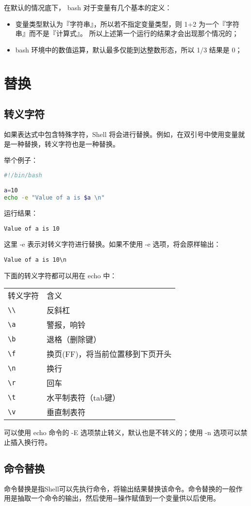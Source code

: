 在默认的情况底下， bash 对于变量有几个基本的定义：
\begin{itemize}
\item 变量类型默认为『字符串』，所以若不指定变量类型，则 1+2 为一个『字符串』而不是『计算式』。 所以上述第一个运行的结果才会出现那个情况的；
\item bash 环境中的数值运算，默认最多仅能到达整数形态，所以 1/3 结果是 0；
\end{itemize}



\section{替换}
\subsection{转义字符}
如果表达式中包含特殊字符，Shell 将会进行替换。例如，在双引号中使用变量就是一种替换，转义字符也是一种替换。

举个例子：
\begin{lstlisting}[language=sh]
#!/bin/bash

a=10
echo -e "Value of a is $a \n"
\end{lstlisting}
运行结果：

\verb|Value of a is 10|

这里 -e 表示对转义字符进行替换。如果不使用 -e 选项，将会原样输出：

\verb|Value of a is 10\n|

下面的转义字符都可以用在 echo 中：
\begin{center}
\begin{tabular}{l|l}
转义字符&	含义\\
\verb|\\|	&反斜杠\\
\verb|\a|	&警报，响铃\\
\verb|\b|	&退格（删除键）\\
\verb|\f|	&换页(FF)，将当前位置移到下页开头\\
\verb|\n|	&换行\\
\verb|\r|	&回车\\
\verb|\t|	&水平制表符（tab键） \\
\verb|\v|	&垂直制表符
\end{tabular}
\end{center}
可以使用 echo 命令的 -E 选项禁止转义，默认也是不转义的；使用 -n 选项可以禁止插入换行符。


\subsection{命令替换}
命令替换是指Shell可以先执行命令，将输出结果替换该命令。命令替换的一般作用是抽取一个命令的输出，然后使用=操作赋值到一个变量供以后使用。

